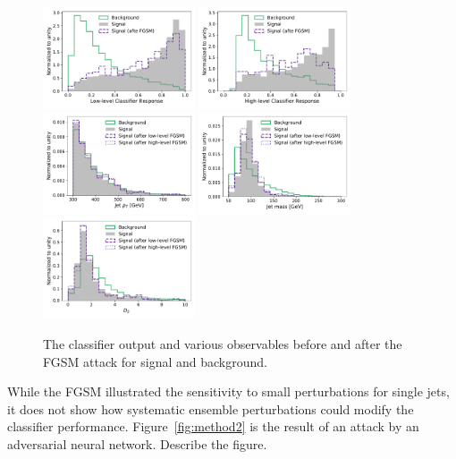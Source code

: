\documentclass[reprint,nofootinbib,...]{revtex4-1}
\begin{document}
\begin{figure}[h!]
\centering
\includegraphics[width=0.4\textwidth]{figures/FGSM/FGSM_NN_LL.pdf}
\includegraphics[width=0.4\textwidth]{figures/FGSM/FGSM_NN_HL.pdf}
\includegraphics[width=0.4\textwidth]{figures/FGSM/FGSM_pT.pdf}
\includegraphics[width=0.4\textwidth]{figures/FGSM/FGSM_mass.pdf}
\includegraphics[width=0.4\textwidth]{figures/FGSM/FGSM_D2.pdf}
\caption{The classifier output and various observables before and after the FGSM attack for signal and background. }
\label{fig:FGSM2}
\end{figure}

While the FGSM illustrated the sensitivity to small perturbations for single jets, it does not show how systematic ensemble perturbations could modify the classifier performance.  Figure~\ref{fig:method2} is the result of an attack by an adversarial neural network.  Describe the figure. 
\end{document}
